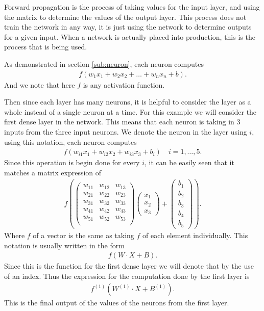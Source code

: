 \documentclass[10pt]{amsart}
\begin{document}
\begin{multicols}{2}
  Forward propagation is the process of taking values for the input layer, and
  using the matrix to determine the values of the output layer. This process
  does not train the network in any way, it is just using the network to
  determine outputs for a given input. When a network is actually placed into
  production, this is the process that is being used.

  As demonstrated in section \ref{sub:neuron}, each neuron computes
  \begin{align*}
    f(w_1x_1+w_2x_2+\ldots+w_nx_n+b).
  \end{align*}
  And we note that here $f$ is any activation function.

  Then since each layer has many neurons, it is helpful to consider the layer
  as a whole instead of a single neuron at a time. For this example we will
  consider the first dense layer in the network. This means that each neuron is
  taking in $3$ inputs from the three input neurons. We denote the neuron in
  the layer using $i$, using this notation, each neuron computes
  \begin{align*}
    f(w_{i1}x_1+w_{i2}x_2+w_{i3}x_3+b_i)\quad i=1,\ldots,5.
  \end{align*}
  Since this operation is begin done for every $i$, it can be easily seen that
  it matches a matrix expression of
  \begin{align*}
    f\left(\begin{pmatrix}
        w_{11} & w_{12} & w_{13}\\
        w_{21} & w_{22} & w_{23}\\
        w_{31} & w_{32} & w_{33}\\
        w_{41} & w_{42} & w_{43}\\
        w_{51} & w_{52} & w_{53}\\
      \end{pmatrix}
      \begin{pmatrix}
        x_1 \\
        x_2 \\
        x_3
      \end{pmatrix}+
      \begin{pmatrix}
        b_1\\
        b_2\\
        b_3\\
        b_4\\
        b_5
      \end{pmatrix}
    \right).
  \end{align*}
  Where $f$ of a vector is the same as taking $f$ of each element individually.
  This notation is usually written in the form
  \begin{align}\label{eq:dense_f}
    f\left(W\cdot X+B\right).
  \end{align}
  Since this is the function for the first dense layer we will denote that by
  the use of an index. Thus the expression for the computation done by the
  first layer is
  \begin{align*}
    f^{(1)}\left(W^{(1)}\cdot X+B^{(1)}\right).
  \end{align*}
  This is the final output of the values of the neurons from the first layer.


\end{multicols}
\end{document}
